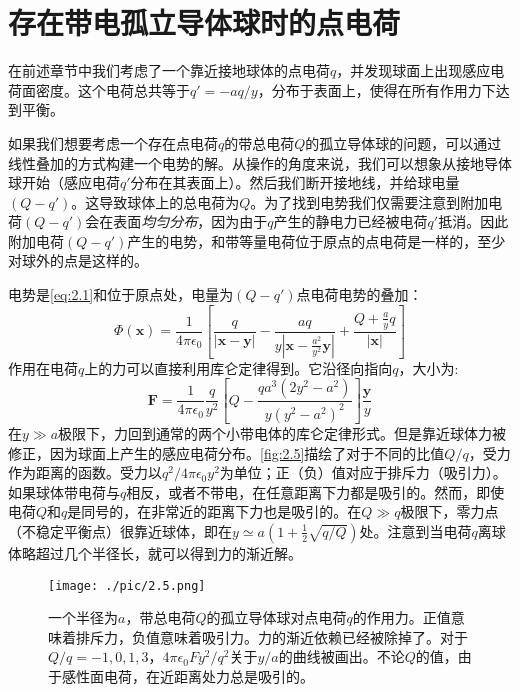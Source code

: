 \documentclass[12pt]{book}
\numberwithin{equation}{chapter}
\numberwithin{figure}{chapter}
\numberwithin{footnote}{page}
\begin{document}
\section{存在带电孤立导体球时的点电荷}\label{sec:2.3}

在前述章节中我们考虑了一个靠近接地球体的点电荷$q$，并发现球面上出现感应电荷面密度。这个电荷总共等于$q'=-aq/y$，分布于表面上，使得在所有作用力下达到平衡。

如果我们想要考虑一个存在点电荷$q$的带总电荷$Q$的孤立导体球的问题，可以通过线性叠加的方式构建一个电势的解。从操作的角度来说，我们可以想象从接地导体球开始（感应电荷$q'$分布在其表面上）。然后我们断开接地线，并给球电量$(Q-q')$。这导致球体上的总电荷为$Q$。为了找到电势我们仅需要注意到附加电荷$(Q-q')$会在表面\textit{均匀分布}，因为由于$q$产生的静电力已经被电荷$q'$抵消。因此附加电荷$(Q-q')$产生的电势，和带等量电荷位于原点的点电荷是一样的，至少对球外的点是这样的。

电势是\autoref{eq:2.1}和位于原点处，电量为$(Q-q')$点电荷电势的叠加：
\begin{equation}\label{eq:2.8}
    \Phi(\mathbf{x})=\frac{1}{4\pi\epsilon_0}[\frac{q}{|\mathbf{x}-\mathbf{y}|}-\frac{aq}{y|\mathbf{x}-\frac{a^2}{y^2}\mathbf{y}|}+\frac{Q+\frac{a}{y}q}{|\mathbf{x}|}]
\end{equation}
作用在电荷$q$上的力可以直接利用库仑定律得到。它沿径向指向$q$，大小为:
\begin{equation}\label{eq:2.9}
    \mathbf{F}=\frac{1}{4\pi\epsilon_0}\frac{q}{y^2}[Q-\frac{qa^3(2y^2-a^2)}{y(y^2-a^2)^2}]\frac{\mathbf{y}}{y}
\end{equation}
在$y\gg a$极限下，力回到通常的两个小带电体的库仑定律形式。但是靠近球体力被修正，因为球面上产生的感应电荷分布。\autoref{fig:2.5}描绘了对于不同的比值$Q/q$，受力作为距离的函数。受力以$q^2/4\pi\epsilon_0y^2$为单位；正（负）值对应于排斥力（吸引力）。如果球体带电荷与$q$相反，或者不带电，在任意距离下力都是吸引的。然而，即使电荷$Q$和$q$是同号的，在非常近的距离下力也是吸引的。在$Q\gg q$极限下，零力点（不稳定平衡点）很靠近球体，即在$y\simeq a(1+\frac{1}{2}\sqrt{q/Q})$处。注意到当电荷$q$离球体略超过几个半径长，就可以得到力的渐近解。

\begin{figure}[!ht]
    \centering
    \texttt{[image: ./pic/2.5.png]}
    \captionsetup{justification=raggedright, singlelinecheck=false}
    \caption{一个半径为$a$，带总电荷$Q$的孤立导体球对点电荷$q$的作用力。正值意味着排斥力，负值意味着吸引力。力的渐近依赖已经被除掉了。对于$Q/q=-1,0,1,3$，$4\pi\epsilon_0 F y^2/q^2$关于$y/a$的曲线被画出。不论$Q$的值，由于感性面电荷，在近距离处力总是吸引的。}
    \label{fig:2.5}
\end{figure}
\end{document}
